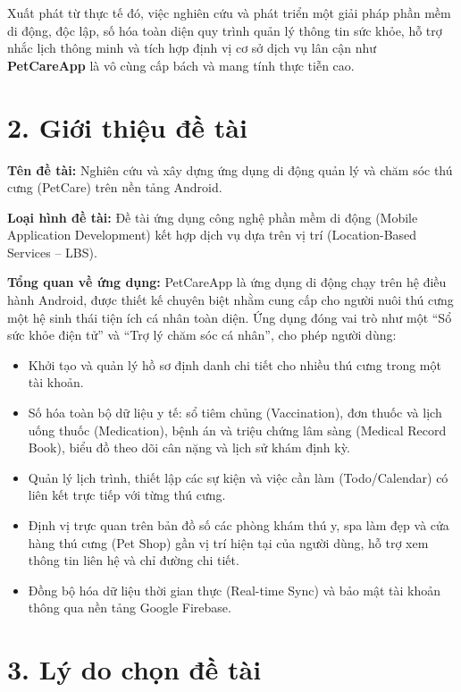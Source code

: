 Xuất phát từ thực tế đó, việc nghiên cứu và phát triển một giải pháp phần mềm di động, độc lập, số hóa toàn diện quy trình quản lý thông tin sức khỏe, hỗ trợ nhắc lịch thông minh và tích hợp định vị cơ sở dịch vụ lân cận như \textbf{PetCareApp} là vô cùng cấp bách và mang tính thực tiễn cao.

\section*{2. Giới thiệu đề tài}

\textbf{Tên đề tài:} Nghiên cứu và xây dựng ứng dụng di động quản lý và chăm sóc thú cưng (PetCare) trên nền tảng Android.

\textbf{Loại hình đề tài:} Đề tài ứng dụng công nghệ phần mềm di động (Mobile Application Development) kết hợp dịch vụ dựa trên vị trí (Location-Based Services -- LBS).

\textbf{Tổng quan về ứng dụng:} PetCareApp là ứng dụng di động chạy trên hệ điều hành Android, được thiết kế chuyên biệt nhằm cung cấp cho người nuôi thú cưng một hệ sinh thái tiện ích cá nhân toàn diện. Ứng dụng đóng vai trò như một ``Sổ sức khỏe điện tử'' và ``Trợ lý chăm sóc cá nhân'', cho phép người dùng:
\begin{itemize}
    \item Khởi tạo và quản lý hồ sơ định danh chi tiết cho nhiều thú cưng trong một tài khoản.
    \item Số hóa toàn bộ dữ liệu y tế: sổ tiêm chủng (Vaccination), đơn thuốc và lịch uống thuốc (Medication), bệnh án và triệu chứng lâm sàng (Medical Record Book), biểu đồ theo dõi cân nặng và lịch sử khám định kỳ.
    \item Quản lý lịch trình, thiết lập các sự kiện và việc cần làm (Todo/Calendar) có liên kết trực tiếp với từng thú cưng.
    \item Định vị trực quan trên bản đồ số các phòng khám thú y, spa làm đẹp và cửa hàng thú cưng (Pet Shop) gần vị trí hiện tại của người dùng, hỗ trợ xem thông tin liên hệ và chỉ đường chi tiết.
    \item Đồng bộ hóa dữ liệu thời gian thực (Real-time Sync) và bảo mật tài khoản thông qua nền tảng Google Firebase.
\end{itemize}

\section*{3. Lý do chọn đề tài}

